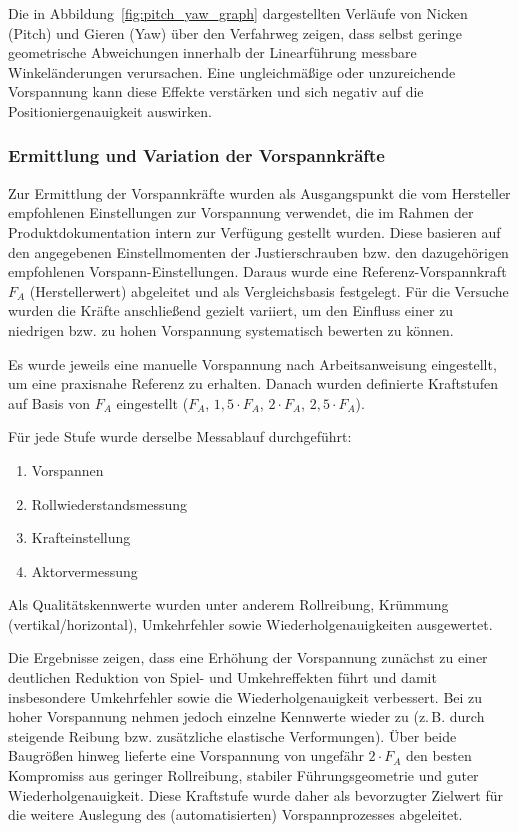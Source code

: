 Die in Abbildung~\ref{fig:pitch_yaw_graph} dargestellten Verläufe von Nicken (Pitch) und Gieren (Yaw) über den Verfahrweg zeigen, dass selbst geringe geometrische Abweichungen innerhalb der Linearführung messbare Winkeländerungen verursachen. Eine ungleichmäßige oder unzureichende Vorspannung kann diese Effekte verstärken und sich negativ auf die Positioniergenauigkeit auswirken.

\subsubsection{Ermittlung und Variation der Vorspannkräfte}
Zur Ermittlung der Vorspannkräfte wurden als Ausgangspunkt die vom Hersteller empfohlenen Einstellungen zur Vorspannung verwendet, die im Rahmen der Produktdokumentation intern zur Verfügung gestellt wurden. Diese basieren auf den angegebenen Einstellmomenten der Justierschrauben bzw. den dazugehörigen empfohlenen Vorspann-Einstellungen. Daraus wurde eine Referenz-Vorspannkraft $F_A$ (Herstellerwert) abgeleitet und als Vergleichsbasis festgelegt. Für die Versuche wurden die Kräfte anschließend gezielt variiert, um den Einfluss einer zu niedrigen bzw. zu hohen Vorspannung systematisch bewerten zu können.

Es wurde jeweils eine manuelle Vorspannung nach Arbeitsanweisung eingestellt, um eine praxisnahe Referenz zu erhalten. Danach wurden definierte Kraftstufen auf Basis von $F_A$ eingestellt ($F_A$, $1{,}5\cdot F_A$, $2\cdot F_A$, $2{,}5\cdot F_A$).

Für jede Stufe wurde derselbe Messablauf durchgeführt:
\begin{enumerate}
    \item Vorspannen
    \item Rollwiederstandsmessung
    \item Krafteinstellung
    \item Aktorvermessung
\end{enumerate}

Als Qualitätskennwerte wurden unter anderem Rollreibung, Krümmung (vertikal/horizontal), Umkehrfehler sowie Wiederholgenauigkeiten ausgewertet.

Die Ergebnisse zeigen, dass eine Erhöhung der Vorspannung zunächst zu einer deutlichen Reduktion von Spiel- und Umkehreffekten führt und damit insbesondere Umkehrfehler sowie die Wiederholgenauigkeit verbessert. Bei zu hoher Vorspannung nehmen jedoch einzelne Kennwerte wieder zu (z.\,B. durch steigende Reibung bzw. zusätzliche elastische Verformungen). Über beide Baugrößen hinweg lieferte eine Vorspannung von ungefähr $2\cdot F_A$ den besten Kompromiss aus geringer Rollreibung, stabiler Führungsgeometrie und guter Wiederholgenauigkeit. Diese Kraftstufe wurde daher als bevorzugter Zielwert für die weitere Auslegung des (automatisierten) Vorspannprozesses abgeleitet.

